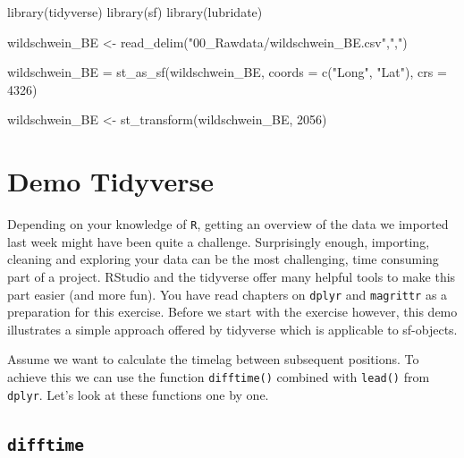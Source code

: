 \documentclass[
]{book}
\newenvironment{Shaded}{\begin{snugshade}}{\end{snugshade}}
\newcommand{\AttributeTok}[1]{\textcolor[rgb]{0.77,0.63,0.00}{#1}}
\newcommand{\DecValTok}[1]{\textcolor[rgb]{0.00,0.00,0.81}{#1}}
\newcommand{\FunctionTok}[1]{\textcolor[rgb]{0.00,0.00,0.00}{#1}}
\newcommand{\NormalTok}[1]{#1}
\newcommand{\OtherTok}[1]{\textcolor[rgb]{0.56,0.35,0.01}{#1}}
\newcommand{\StringTok}[1]{\textcolor[rgb]{0.31,0.60,0.02}{#1}}
\begin{document}
\begin{Shaded}
\begin{Highlighting}[]
\FunctionTok{library}\NormalTok{(tidyverse)}
\FunctionTok{library}\NormalTok{(sf)}
\FunctionTok{library}\NormalTok{(lubridate)}

\NormalTok{wildschwein\_BE }\OtherTok{\textless{}{-}} \FunctionTok{read\_delim}\NormalTok{(}\StringTok{"00\_Rawdata/wildschwein\_BE.csv"}\NormalTok{,}\StringTok{","}\NormalTok{)}

\NormalTok{wildschwein\_BE }\OtherTok{=} \FunctionTok{st\_as\_sf}\NormalTok{(wildschwein\_BE, }
                          \AttributeTok{coords =} \FunctionTok{c}\NormalTok{(}\StringTok{"Long"}\NormalTok{, }\StringTok{"Lat"}\NormalTok{), }
                          \AttributeTok{crs =} \DecValTok{4326}\NormalTok{)}

\NormalTok{wildschwein\_BE }\OtherTok{\textless{}{-}} \FunctionTok{st\_transform}\NormalTok{(wildschwein\_BE, }\DecValTok{2056}\NormalTok{)}
\end{Highlighting}
\end{Shaded}

\hypertarget{demo-tidyverse}{%
\section{Demo Tidyverse}\label{demo-tidyverse}}

Depending on your knowledge of \texttt{R}, getting an overview of the data we imported last week might have been quite a challenge. Surprisingly enough, importing, cleaning and exploring your data can be the most challenging, time consuming part of a project. RStudio and the tidyverse offer many helpful tools to make this part easier (and more fun). You have read chapters on \texttt{dplyr} and \texttt{magrittr} as a preparation for this exercise. Before we start with the exercise however, this demo illustrates a simple approach offered by tidyverse which is applicable to sf-objects.

Assume we want to calculate the timelag between subsequent positions. To achieve this we can use the function \texttt{difftime()} combined with \texttt{lead()} from \texttt{dplyr}. Let's look at these functions one by one.

\hypertarget{difftime}{%
\subsection{\texorpdfstring{\texttt{difftime}}{difftime}}\label{difftime}}
\end{document}

